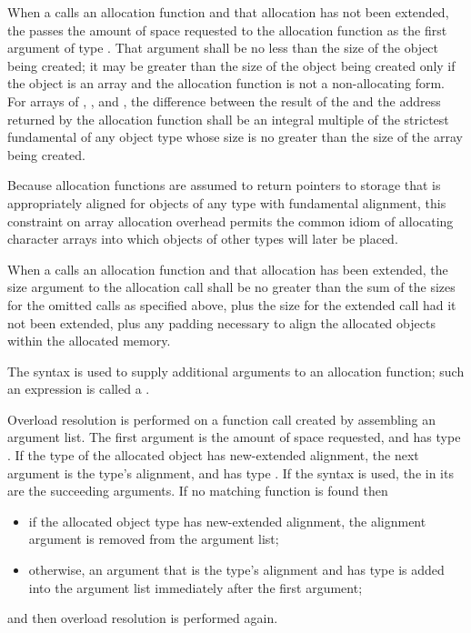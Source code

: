 \pnum
When a  calls an allocation function and that
allocation has not been extended, the
 passes the amount of space requested to the
allocation function as the first argument of type
. That argument shall be no less than the size
of the object being created; it may be greater than the size of the
object being created only if the object is an array and
the allocation function is not a non-allocating form.
For arrays of
, , and ,
the difference between the
result of the  and the address returned by the
allocation function shall be an integral multiple of the
strictest fundamental
 of any object type whose size
is no greater than the size of the array being created.
\begin{note}
%
Because allocation functions are assumed to return pointers to storage
that is appropriately aligned for objects of any type
with fundamental alignment, this constraint
on array allocation overhead permits the common idiom of allocating
character arrays into which objects of other types will later be placed.
\end{note}

\pnum
When a  calls an allocation function and that
allocation has been extended, the size argument to the allocation call shall
be no greater than the sum of the sizes for the omitted calls as specified
above, plus the size for the extended call had it not been extended, plus any
padding necessary to align the allocated objects within the allocated memory.

\pnum
{}%
The  syntax is used to supply additional
arguments to an allocation function; such an expression is called
a .

\pnum
Overload resolution is
performed on a function call created by assembling an argument list.
The first argument is
the amount of space requested,
and has type .
If the type of the allocated object has new-extended alignment,
the next argument is
the type's alignment,
and has type .
If the  syntax is used,
the 
in its 
are the succeeding arguments.
If no matching function is found then
\begin{itemize}

\item
if the allocated object type has new-extended alignment,
the alignment argument is removed from the argument list;

\item
otherwise, an argument that
is the type's alignment and has type 
is added into the argument list immediately after the first argument;
\end{itemize}
and then overload resolution is performed again.

